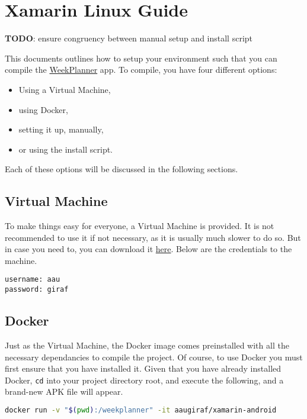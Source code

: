\chapter{Xamarin Linux Guide} \label{app:xamarin-linux}

\textbf{TODO}: ensure congruency between manual setup and install script

This documents outlines how to setup your environment such that you can
compile the \href{https://github.com/aau-giraf/weekplanner}{WeekPlanner}
app. To compile, you have four different options:

\begin{itemize}
    \item Using a Virtual Machine,
    \item using Docker,
    \item setting it up, manually,
    \item or using the install script.
\end{itemize}

Each of these options will be discussed in the following sections.

\section{Virtual Machine}

To make things easy for everyone, a Virtual Machine is provided. It is
not recommended to use it if not necessary, as it is usually much slower
to do so. But in case you need to, you can download it
\href{https://drive.google.com/file/d/1fxhboUHWcESF-H_CMSkNJFypwQi8fvjI/view?usp=sharing}{here}.
Below are the credentials to the machine.

\begin{lstlisting}
username: aau
password: giraf
\end{lstlisting}

\section{Docker}

Just as the Virtual Machine, the Docker image comes preinstalled with
all the necessary dependancies to compile the project. Of course, to use
Docker you must first ensure that you have installed it. Given that you
have already installed Docker, \lstinline{cd} into your
project directory root, and execute the following, and a brand-new APK
file will appear.

\begin{lstlisting}[language=bash]
docker run -v "$(pwd):/weekplanner" -it aaugiraf/xamarin-android
\end{lstlisting}


